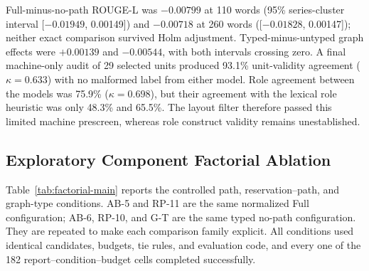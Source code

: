 \documentclass[information,article,submit,moreauthors]{Definitions/mdpi}
\begin{document}
Full-minus-no-path ROUGE-L was $-0.00799$ at 110 words (95\% series-cluster interval [$-0.01949$, 0.00149]) and $-0.00718$ at 260 words ([$-0.01828$, 0.00147]); neither exact comparison survived Holm adjustment. Typed-minus-untyped graph effects were $+0.00139$ and $-0.00544$, with both intervals crossing zero. A final machine-only audit of 29 selected units produced 93.1\% unit-validity agreement ($\kappa=0.633$) with no malformed label from either model. Role agreement between the models was 75.9\% ($\kappa=0.698$), but their agreement with the lexical role heuristic was only 48.3\% and 65.5\%. The layout filter therefore passed this limited machine prescreen, whereas role construct validity remains unestablished.

\subsection{Exploratory Component Factorial Ablation}
\label{sec:factorial}

Table~\ref{tab:factorial-main} reports the controlled path, reservation--path, and graph-type conditions. AB-5 and RP-11 are the same normalized Full configuration; AB-6, RP-10, and G-T are the same typed no-path configuration. They are repeated to make each comparison family explicit. All conditions used identical candidates, budgets, tie rules, and evaluation code, and every one of the 182 report--condition--budget cells completed successfully.
\end{document}
